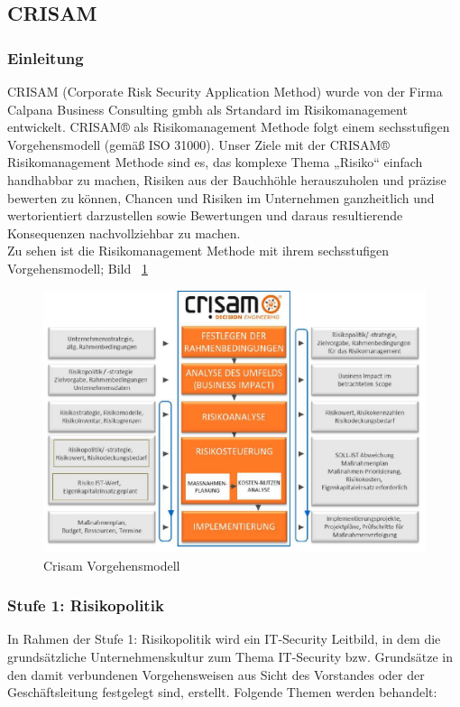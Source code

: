 \subsection{CRISAM}
\subsubsection{Einleitung}

CRISAM (Corporate Risk Security Application Method) wurde von der Firma Calpana Business Consulting gmbh als Srtandard im Risikomanagement entwickelt. CRISAM® als Risikomanagement Methode folgt einem sechsstufigen Vorgehensmodell (gemäß ISO 31000). Unser Ziele mit der CRISAM® Risikomanagement Methode sind  es,  das komplexe Thema „Risiko“ einfach handhabbar zu machen, Risiken aus der Bauchhöhle herauszuholen und präzise bewerten zu können,  Chancen und Risiken im Unternehmen ganzheitlich und  wertorientiert darzustellen sowie Bewertungen und daraus resultierende Konsequenzen nachvollziehbar zu machen.
\\

Zu sehen ist die Risikomanagement Methode mit ihrem sechsstufigen Vorgehensmodell; Bild ~\ref{fig:bsp}

\begin{figure}[htbp]
\centering
\includegraphics[scale =0.5 ]{images/Vorgehensmodell}
\caption{Crisam Vorgehensmodell}
\label{fig:bsp}
\end{figure}


	
\subsubsection {Stufe 1: Risikopolitik}
In Rahmen der Stufe 1: Risikopolitik wird ein IT-Security Leitbild, in dem die grundsätzliche Unternehmenskultur zum Thema IT-Security bzw. Grundsätze in den damit verbundenen Vorgehensweisen aus Sicht des Vorstandes oder der Geschäftsleitung festgelegt sind, erstellt. Folgende Themen werden behandelt:\\

